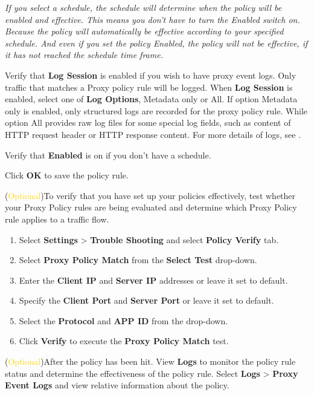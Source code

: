 \begin{description}
    \notemark\textit{If you select a schedule, the schedule will determine when the policy will be enabled and effective. This means you don’t have to turn the Enabled switch on. Because the policy will automatically be effective according to your specified schedule. And even if you set the policy Enabled, the policy will not be effective, if it has not reached the schedule time frame.}
    \item[STEP 11.]	Verify that \textbf{Log Session} is enabled if you wish to have proxy event logs. Only traffic that matches a Proxy policy rule will be logged. 
    When \textbf{Log Session} is enabled, select one of \textbf{Log Options}, Metadata only or All. If option Metadata only is enabled, only structured logs are recorded for the proxy policy rule. 
    While option All provides raw log files for some special log fields, such as content of HTTP request header or HTTP response content. For more details of logs, see \textbf{\hyperlink{link:View and Manage Logs}{\color{linkblue}{View and Manage Logs}}}.
    \item[STEP 12.]	Verify that \textbf{Enabled} is on if you don’t have a schedule.
    \item[STEP 13.]	Click \textbf{OK} to save the policy rule.
    \item[STEP 14.]	(\textcolor{gold}{Optional})To verify that you have set up your policies effectively, test whether your Proxy Policy rules are being evaluated and determine which Proxy Policy rule applies to a traffic flow. 
    \begin{enumerate}
        \item Select \textbf{Settings} > \textbf{Trouble Shooting} and select \textbf{Policy Verify} tab.
        \item Select \textbf{Proxy Policy Match} from the \textbf{Select Test} drop-down. 
        \item Enter the \textbf{Client IP} and \textbf{Server IP} addresses or leave it set to default.
        \item Specify the \textbf{Client Port} and \textbf{Server Port} or leave it set to default.
        \item Select the \textbf{Protocol} and \textbf{APP ID} from the drop-down. 
        \item Click \textbf{Verify} to execute the \textbf{Proxy Policy Match} test.
    \end{enumerate}
    \item[STEP 15.]	(\textcolor{gold}{Optional})After the policy has been hit. View \textbf{Logs} to monitor the policy rule status and determine the effectiveness of the policy rule. 
    Select \textbf{Logs} > \textbf{Proxy Event Logs} and view relative information about the policy.
\end{description}


